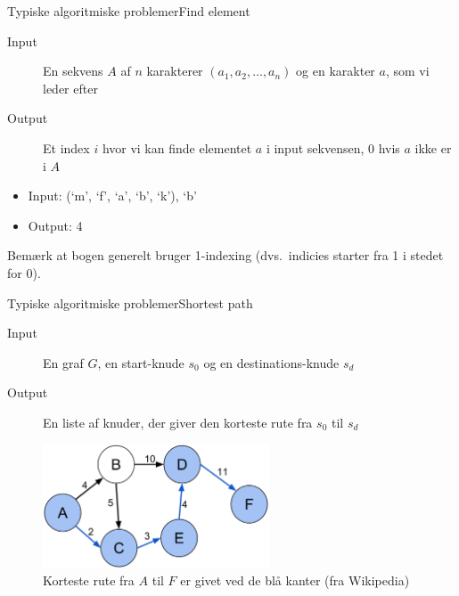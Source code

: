 \documentclass{beamer}
\begin{document}
\begin{frame}{Typiske algoritmiske problemer}{Find element}

    \begin{description}
        \item[Input] En sekvens $A$ af $n$ karakterer $(a_1, a_2, \ldots, a_n)$
            og en karakter $a$, som vi leder efter
        \item[Output] Et index $i$ hvor vi kan finde elementet $a$ i input
            sekvensen, 0 hvis $a$ ikke er i $A$
    \end{description}

    \pause

    \begin{example}
        \begin{itemize}
            \item Input: (`m', `f', `a', `b', `k'), `b'
            \item Output: 4
        \end{itemize}
    \end{example}

    Bemærk at bogen generelt bruger 1-indexing (dvs.\ indicies starter fra 1
    i stedet for 0).
    
\end{frame}

\begin{frame}{Typiske algoritmiske problemer}{Shortest path}
    \begin{description}
        \item[Input] En graf $G$, en start-knude $s_0$ og en destinations-knude
            $s_d$
        \item[Output] En liste af knuder, der giver den korteste rute fra $s_0$
            til $s_d$
    \end{description}

    \pause
    \begin{figure}[h]
        \centering
        \includegraphics[width=0.6\textwidth]{shortest-path-wiki}
        \caption{%
            Korteste rute fra $A$ til $F$ er givet ved de blå kanter (fra
            Wikipedia)
        }
        \label{fig:shortest-path-wiki}
    \end{figure}
\end{frame}
\end{document}
